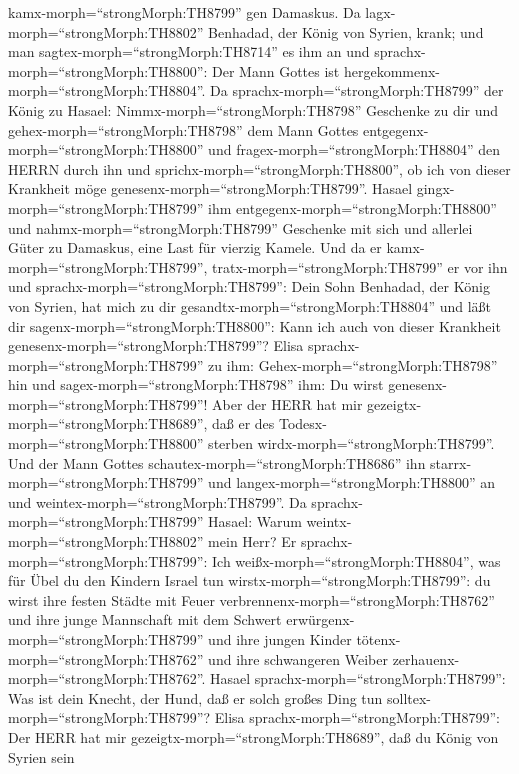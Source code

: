 kamx-morph=``strongMorph:TH8799'' gen Damaskus. Da
lagx-morph=``strongMorph:TH8802'' Benhadad, der König von Syrien, krank;
und man sagtex-morph=``strongMorph:TH8714'' es ihm an und
sprachx-morph=``strongMorph:TH8800'': Der Mann Gottes ist
hergekommenx-morph=``strongMorph:TH8804''.  Da
sprachx-morph=``strongMorph:TH8799'' der König zu Hasael:
Nimmx-morph=``strongMorph:TH8798'' Geschenke zu dir und
gehex-morph=``strongMorph:TH8798'' dem Mann Gottes
entgegenx-morph=``strongMorph:TH8800'' und
fragex-morph=``strongMorph:TH8804'' den HERRN durch ihn und
sprichx-morph=``strongMorph:TH8800'', ob ich von dieser Krankheit möge
genesenx-morph=``strongMorph:TH8799''.  Hasael
gingx-morph=``strongMorph:TH8799'' ihm
entgegenx-morph=``strongMorph:TH8800'' und
nahmx-morph=``strongMorph:TH8799'' Geschenke mit sich und allerlei Güter
zu Damaskus, eine Last für vierzig Kamele. Und da er
kamx-morph=``strongMorph:TH8799'', tratx-morph=``strongMorph:TH8799'' er
vor ihn und sprachx-morph=``strongMorph:TH8799'': Dein Sohn Benhadad,
der König von Syrien, hat mich zu dir
gesandtx-morph=``strongMorph:TH8804'' und läßt dir
sagenx-morph=``strongMorph:TH8800'': Kann ich auch von dieser Krankheit
genesenx-morph=``strongMorph:TH8799''?  Elisa
sprachx-morph=``strongMorph:TH8799'' zu ihm:
Gehex-morph=``strongMorph:TH8798'' hin und
sagex-morph=``strongMorph:TH8798'' ihm: Du wirst
genesenx-morph=``strongMorph:TH8799''! Aber der HERR hat mir
gezeigtx-morph=``strongMorph:TH8689'', daß er des
Todesx-morph=``strongMorph:TH8800'' sterben
wirdx-morph=``strongMorph:TH8799''.  Und der Mann Gottes
schautex-morph=``strongMorph:TH8686'' ihn
starrx-morph=``strongMorph:TH8799'' und
langex-morph=``strongMorph:TH8800'' an und
weintex-morph=``strongMorph:TH8799''.  Da
sprachx-morph=``strongMorph:TH8799'' Hasael: Warum
weintx-morph=``strongMorph:TH8802'' mein Herr? Er
sprachx-morph=``strongMorph:TH8799'': Ich
weißx-morph=``strongMorph:TH8804'', was für Übel du den Kindern Israel
tun wirstx-morph=``strongMorph:TH8799'': du wirst ihre festen Städte mit
Feuer verbrennenx-morph=``strongMorph:TH8762'' und ihre junge Mannschaft
mit dem Schwert erwürgenx-morph=``strongMorph:TH8799'' und ihre jungen
Kinder tötenx-morph=``strongMorph:TH8762'' und ihre schwangeren Weiber
zerhauenx-morph=``strongMorph:TH8762''.  Hasael
sprachx-morph=``strongMorph:TH8799'': Was ist dein Knecht, der Hund, daß
er solch großes Ding tun solltex-morph=``strongMorph:TH8799''? Elisa
sprachx-morph=``strongMorph:TH8799'': Der HERR hat mir
gezeigtx-morph=``strongMorph:TH8689'', daß du König von Syrien sein
